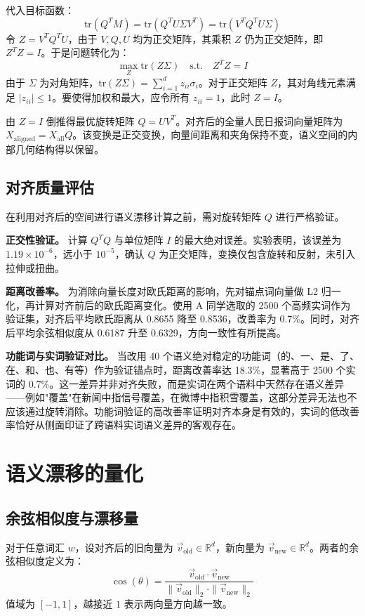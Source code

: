 \documentclass{article}
\begin{document}
代入目标函数：
\[
\text{tr}(Q^T M) = \text{tr}(Q^T U \Sigma V^T) = \text{tr}(V^T Q^T U \Sigma)
\]
令 $Z = V^T Q^T U$，由于 $V, Q, U$ 均为正交矩阵，其乘积 $Z$ 仍为正交矩阵，即 $Z^T Z = I$。于是问题转化为：
\[
\max_{Z} \text{tr}(Z \Sigma) \quad \text{s.t.} \quad Z^T Z = I
\]
由于 $\Sigma$ 为对角矩阵，$\text{tr}(Z \Sigma) = \sum_{i=1}^{d} z_{ii} \sigma_i$。对于正交矩阵 $Z$，其对角线元素满足 $|z_{ii}| \leq 1$。要使得加权和最大，应令所有 $z_{ii} = 1$，此时 $Z = I$。

由 $Z = I$ 倒推得最优旋转矩阵 $Q = U V^T$。对齐后的全量人民日报词向量矩阵为 $X_{\text{aligned}} = X_{\text{all}} Q$。该变换是正交变换，向量间距离和夹角保持不变，语义空间的内部几何结构得以保留。

\subsection{对齐质量评估}

在利用对齐后的空间进行语义漂移计算之前，需对旋转矩阵 $Q$ 进行严格验证。

\textbf{正交性验证。}
计算 $Q^T Q$ 与单位矩阵 $I$ 的最大绝对误差。实验表明，该误差为 $1.19 \times 10^{-6}$，远小于 $10^{-5}$，确认 $Q$ 为正交矩阵，变换仅包含旋转和反射，未引入拉伸或扭曲。

\textbf{距离改善率。}
为消除向量长度对欧氏距离的影响，先对锚点词向量做 L2 归一化，再计算对齐前后的欧氏距离变化。使用 A 同学选取的 2500 个高频实词作为验证集，对齐后平均欧氏距离从 0.8655 降至 0.8536，改善率为 0.7\%。同时，对齐后平均余弦相似度从 0.6187 升至 0.6329，方向一致性有所提高。

\textbf{功能词与实词验证对比。}
当改用 40 个语义绝对稳定的功能词（的、一、是、了、在、和、也、有等）作为验证锚点时，距离改善率达 18.3\%，显著高于 2500 个实词的 0.7\%。这一差异并非对齐失败，而是实词在两个语料中天然存在语义差异——例如"覆盖"在新闻中指信号覆盖，在微博中指积雪覆盖，这部分差异无法也不应该通过旋转消除。功能词验证的高改善率证明对齐本身是有效的，实词的低改善率恰好从侧面印证了跨语料实词语义差异的客观存在。

\section{语义漂移的量化}

\subsection{余弦相似度与漂移量}

对于任意词汇 $w$，设对齐后的旧向量为 $\vec{v}_{\text{old}} \in \mathbb{R}^d$，新向量为 $\vec{v}_{\text{new}} \in \mathbb{R}^d$。两者的余弦相似度定义为：
\[
\cos(\theta) = \frac{\vec{v}_{\text{old}} \cdot \vec{v}_{\text{new}}}{\|\vec{v}_{\text{old}}\|_2 \cdot \|\vec{v}_{\text{new}}\|_2}
\]
值域为 $[-1, 1]$，越接近 $1$ 表示两向量方向越一致。
\end{document}
